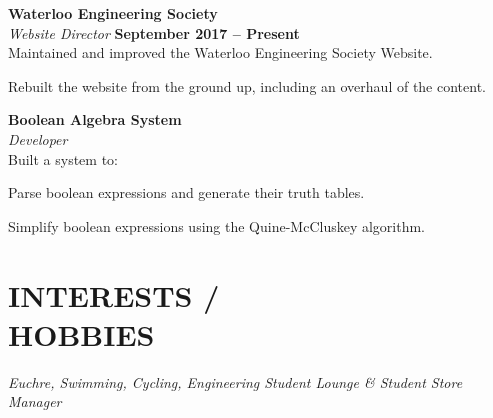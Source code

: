\documentclass[margin,line]{resume}
\begin{document}
\begin{resume}
    \textbf{\listing Waterloo Engineering Society} \vspace{2mm}\\\vspace{1mm}%
    \textsl{Website Director} \hfill \textbf{September 2017 -- Present}\\
    Maintained and improved the Waterloo Engineering Society Website. \\
    \begin{tightemize}
    \item Rebuilt the website from the ground up, including an overhaul of the content.
    \end{tightemize}

    \textbf{\listing Boolean Algebra System} \vspace{2mm}\\\vspace{1mm}%
    \textsl{Developer}\\
    Built a system to:\\
    \begin{tightemize}
    \item Parse boolean expressions and generate their truth tables.
    \item Simplify boolean expressions using the Quine-McCluskey algorithm.
    \end{tightemize}

\sectionline

    \section{\mysidestyle \textbf{\large{I}\small{NTERESTS  / \\ \large{H}\small{OBBIES}}}}

    \textsl{Euchre, Swimming, Cycling, Engineering Student Lounge \& Student Store Manager}\\

\end{resume}
\end{document}
